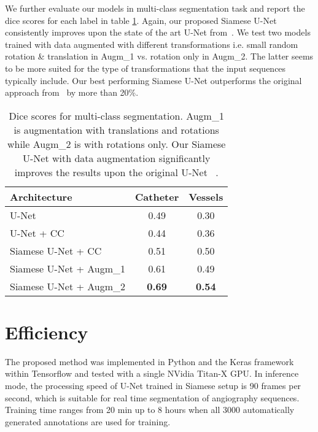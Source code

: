 \documentclass{bmvc2k}
\begin{document}
We further evaluate our models in multi-class segmentation task and report the dice scores for each label in table  \ref{Quant_results_2}. Again, our proposed Siamese U-Net consistently improves upon the state of the art U-Net from~\cite{unet}. We test two models trained with data augmented with different transformations i.e. small random rotation \& translation in Augm\_1 vs. rotation only in Augm\_2. The latter seems to be more suited for the type of transformations that the input sequences typically include. 
Our best performing Siamese U-Net outperforms the original approach from~\cite{unet} by more than 20\%.



\begin{table}[h]
\begin{tabular}{|l|c|c|}
	\hline
	\textbf{Architecture}  & \textbf{Catheter } & \textbf{Vessels}\\
	\hline\hline
	U-Net  & 0.49 & 0.30\\
	\hline
	U-Net + CC   & 0.44 & 0.36\\
	\hline
	Siamese  U-Net + CC   & 0.51 & 0.50\\
	\hline
	Siamese U-Net + Augm\_1  & 0.61 & 0.49\\
	\hline
	Siamese U-Net + Augm\_2  & {\bf 0.69} & {\bf 0.54}\\
	\hline
\end{tabular}
\caption{Dice scores for multi-class segmentation. Augm\_1 is augmentation with translations and rotations while Augm\_2 is with rotations only. Our Siamese U-Net with data augmentation significantly improves the results upon the original U-Net ~\cite{unet}.}
\label{Quant_results_2}
\end{table}

\section{Efficiency}
The proposed method was implemented in Python and the Keras framework within Tensorflow and tested with a single NVidia Titan-X GPU. In inference mode, the processing speed of U-Net trained in Siamese setup is 90 frames per second, which is suitable for real time segmentation of angiography sequences. Training time ranges from 20 min up to 8 hours when all 3000 automatically generated annotations are used for training.
\end{document}
